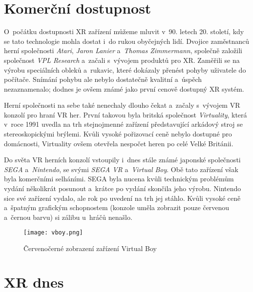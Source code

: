 \section{Komerční dostupnost}

O~počátku dostupnosti XR zařízení můžeme mluvit v~90. letech 20. století, kdy se tato technologie mohla dostat i~do rukou obyčejných lidí. Dvojice zaměstnanců herní společnosti \textit{Atari}, \textit{Jaron Lanier} a~\textit{Thomas Zimmermann}, společně založili společnost \textit{VPL Research} a~začali s~vývojem produktů pro XR. Zaměřili se na výrobu speciálních obleků a~rukavic, které dokázaly přenést pohyby uživatele do počítače. Snímání pohybu ale nebylo dostatečně kvalitní a~úspěch nezaznamenalo; dodnes je ovšem známé jako první cenově dostupný XR systém. \cite{otechnice_2}

Herní společnosti na sebe také nenechaly dlouho čekat a~začaly s~vývojem VR konzolí pro hraní VR her. První takovou byla britská společnost \textit{Virtuality}, která v~roce 1991 uvedla na trh stejnojmenné zařízení představující arkádový stroj se stereoskopickými brýlemi. Kvůli vysoké pořizovací ceně nebylo dostupné pro domácnosti, Virtuality ovšem otevřela nespočet heren po celé Velké Británii. \cite{otechnice_2} \cite{independent_virtuality}

Do světa VR herních konzolí vstoupily i~dnes stále známé japonské společnosti \textit{SEGA} a~\textit{Nintendo}, se svými \textit{SEGA VR} a~\textit{Virtual Boy}. Obě tato zařízení však byla komerčními selháními. SEGA byla nucena kvůli technickým problémům vydání několikrát posunout a~krátce po vydání skončila jeho výrobu. Nintendo sice své zařízení vydalo, ale rok po uvedení na trh jej stáhlo. Kvůli vysoké ceně a~špatným grafickým schopnostem (konzole uměla zobrazit pouze červenou a~černou barvu) si zálibu u~hráčů nenašlo.\cite{otechnice_2}

\begin{figure}[H]
    \centering
    \texttt{[image: vboy.png]}
    \caption{Červeno\textendash černé zobrazení zařízení Virtual Boy \cite{vboy}}
    \label{vboy_red_display}
\end{figure}

\section{XR dnes}

